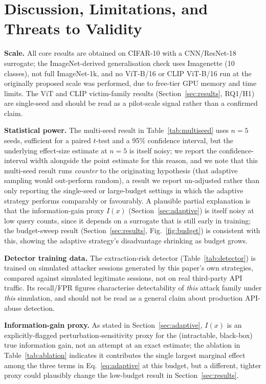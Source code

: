 \documentclass[journal,10pt]{IEEEtran}
\begin{document}
\section{Discussion, Limitations, and Threats to Validity}
\label{sec:discussion}

\textbf{Scale.} All core results are obtained on CIFAR-10 with a CNN/ResNet-18 surrogate; the
ImageNet-derived generalisation check uses Imagenette (10 classes), not full ImageNet-1k, and no
ViT-B/16 or CLIP ViT-B/16 run at the originally proposed scale was performed, due to free-tier
GPU memory and time limits. The ViT and CLIP victim-family results (Section~\ref{sec:results},
RQ1/H1) are single-seed and should be read as a pilot-scale signal rather than a confirmed claim.

\textbf{Statistical power.} The multi-seed result in Table~\ref{tab:multiseed} uses $n=5$ seeds,
sufficient for a paired $t$-test and a 95\% confidence interval, but the underlying effect-size
estimate at $n=5$ is itself noisy; we report the confidence-interval width alongside the point
estimate for this reason, and we note that this multi-seed result runs \emph{counter} to the
originating hypothesis (that adaptive sampling would out-perform random), a result we report
un-adjusted rather than only reporting the single-seed or large-budget settings in which the
adaptive strategy performs comparably or favourably. A plausible partial explanation is that the
information-gain proxy $I(x)$ (Section~\ref{sec:adaptive}) is itself noisy at low query counts,
since it depends on a surrogate that is still early in training; the budget-sweep result
(Section~\ref{sec:results}, Fig.~\ref{fig:budget}) is consistent with this, showing the adaptive
strategy's disadvantage shrinking as budget grows.

\textbf{Detector training data.} The extraction-risk detector (Table~\ref{tab:detector}) is trained
on simulated attacker sessions generated by this paper's own strategies, compared against
simulated legitimate sessions, not on real third-party API traffic. Its recall/FPR figures
characterise detectability of \emph{this} attack family under \emph{this} simulation, and should
not be read as a general claim about production API-abuse detection.

\textbf{Information-gain proxy.} As stated in Section~\ref{sec:adaptive}, $I(x)$ is an
explicitly-flagged perturbation-sensitivity proxy for the (intractable, black-box) true information
gain, not an attempt at an exact estimate; the ablation in Table~\ref{tab:ablation} indicates it
contributes the single largest marginal effect among the three terms in Eq.~\eqref{eq:adaptive} at
this budget, but a different, tighter proxy could plausibly change the low-budget result in
Section~\ref{sec:results}.
\end{document}
